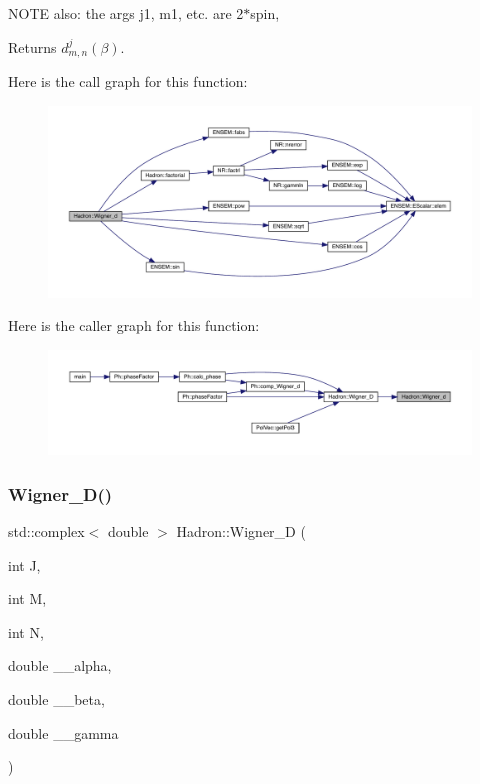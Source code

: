 N\+O\+TE also\+: the args j1, m1, etc. are 2$\ast$spin,

\begin{DoxyReturn}{Returns}
$d^{j}_{m,n}(\beta)$. 
\end{DoxyReturn}
Here is the call graph for this function\+:
\nopagebreak
\begin{figure}[H]
\begin{center}
\leavevmode
\includegraphics[width=350pt]{d1/daf/namespaceHadron_a63c49af65c1d943a78205d3b8b63079a_cgraph}
\end{center}
\end{figure}
Here is the caller graph for this function\+:
\nopagebreak
\begin{figure}[H]
\begin{center}
\leavevmode
\includegraphics[width=350pt]{d1/daf/namespaceHadron_a63c49af65c1d943a78205d3b8b63079a_icgraph}
\end{center}
\end{figure}
\mbox{\label{namespaceHadron_a4d99a17c00bdddfc88a14c0571b74338}} 
\subsubsection{\texorpdfstring{Wigner\_D()}{Wigner\_D()}}
{\footnotesize\ttfamily std\+::complex$<$ double $>$ Hadron\+::\+Wigner\+\_\+D (\begin{DoxyParamCaption}\item[{int}]{J,  }\item[{int}]{M,  }\item[{int}]{N,  }\item[{double}]{\+\_\+\+\_\+alpha,  }\item[{double}]{\+\_\+\+\_\+beta,  }\item[{double}]{\+\_\+\+\_\+gamma }\end{DoxyParamCaption})}


